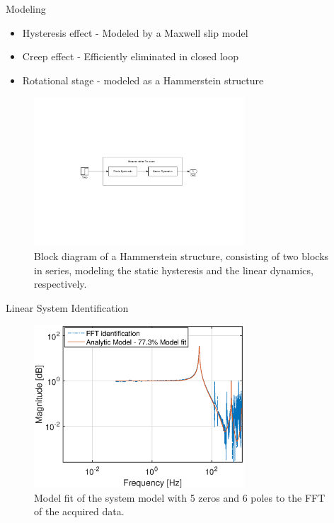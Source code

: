 \documentclass[10pt]{beamer}
\begin{document}
\begin{frame}{Modeling}
  \begin{itemize}
    \item \alert{Hysteresis effect} - Modeled by a Maxwell slip model
    \item \alert{Creep effect} - Efficiently eliminated in closed loop
    \item \alert{Rotational stage} - modeled as a Hammerstein structure
  \end{itemize}
  \begin{figure}[h]
    \centering %
    \includegraphics[width=0.7\textwidth, trim=8cm 8cm 7.73cm 8cm, clip=true]{../fig/matlab/hammerstein}
    \caption{\label{fig:hammerstein}Block diagram of a Hammerstein structure, consisting of two blocks in series, modeling the static hysteresis and the linear dynamics, respectively.}
  \end{figure}
\end{frame}

\begin{frame}{Linear System Identification}
  \begin{figure}[h!]
    \centering
    \includegraphics[width=0.7\textwidth]{../fig/matlab/model.eps}
    \caption{\label{fig:model} Model fit of the system model with 5 zeros and 6 poles to the FFT of the acquired data.}
  \end{figure}
\end{frame}
\end{document}
